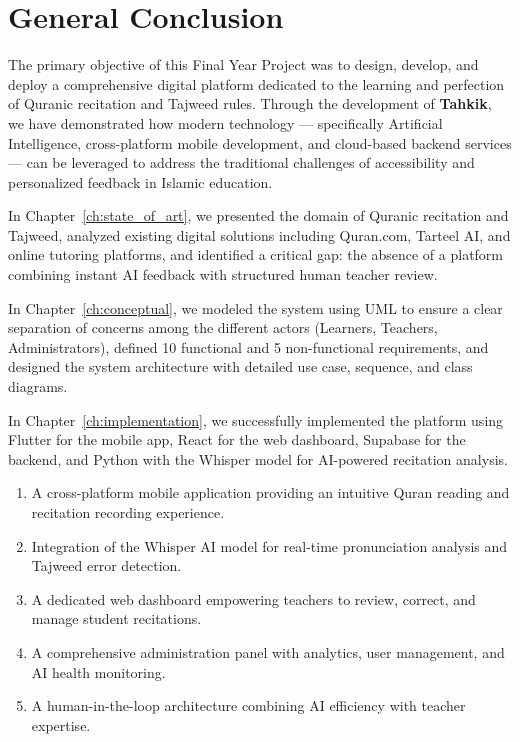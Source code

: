 \chapter*{General Conclusion}
\label{ch:general_conclusion}

The primary objective of this Final Year Project was to design, develop, and deploy a comprehensive digital platform dedicated to the learning and perfection of Quranic recitation and Tajweed rules. Through the development of \textbf{Tahkik}, we have demonstrated how modern technology --- specifically Artificial Intelligence, cross-platform mobile development, and cloud-based backend services --- can be leveraged to address the traditional challenges of accessibility and personalized feedback in Islamic education.

In Chapter~\ref{ch:state_of_art}, we presented the domain of Quranic recitation and Tajweed, analyzed existing digital solutions including Quran.com, Tarteel AI, and online tutoring platforms, and identified a critical gap: the absence of a platform combining instant AI feedback with structured human teacher review.

In Chapter~\ref{ch:conceptual}, we modeled the system using UML to ensure a clear separation of concerns among the different actors (Learners, Teachers, Administrators), defined 10 functional and 5 non-functional requirements, and designed the system architecture with detailed use case, sequence, and class diagrams.

In Chapter~\ref{ch:implementation}, we successfully implemented the platform using Flutter for the mobile app, React for the web dashboard, Supabase for the backend, and Python with the Whisper model for AI-powered recitation analysis.

\begin{emeraldbox}[title=Key Contributions]
\begin{enumerate}
  \item A cross-platform mobile application providing an intuitive Quran reading and recitation recording experience.
  \item Integration of the Whisper AI model for real-time pronunciation analysis and Tajweed error detection.
  \item A dedicated web dashboard empowering teachers to review, correct, and manage student recitations.
  \item A comprehensive administration panel with analytics, user management, and AI health monitoring.
  \item A human-in-the-loop architecture combining AI efficiency with teacher expertise.
\end{enumerate}
\end{emeraldbox}

